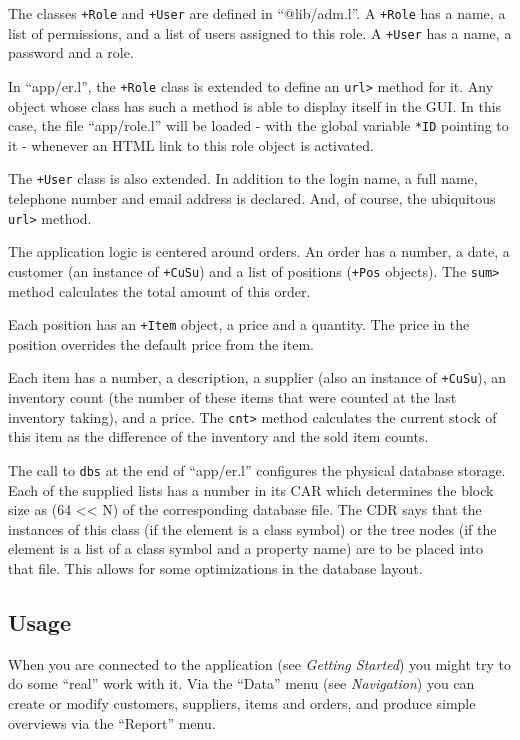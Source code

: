 The classes \texttt{+Role} and \texttt{+User} are defined in ``@lib/adm.l''. A \texttt{+Role}
has a name, a list of permissions, and a list of users assigned to this
role. A \texttt{+User} has a name, a password and a role.

In ``app/er.l'', the \texttt{+Role} class is extended to define an \texttt{url>} method
for it. Any object whose class has such a method is able to display
itself in the GUI. In this case, the file ``app/role.l'' will be loaded -
with the global variable \texttt{*ID} pointing to it - whenever an HTML link to
this role object is activated.

The \texttt{+User} class is also extended. In addition to the login name, a
full name, telephone number and email address is declared. And, of
course, the ubiquitous \texttt{url>} method.

The application logic is centered around orders. An order has a number,
a date, a customer (an instance of \texttt{+CuSu}) and a list of positions
(\texttt{+Pos} objects). The \texttt{sum>} method calculates the total amount of this
order.

Each position has an \texttt{+Item} object, a price and a quantity. The price
in the position overrides the default price from the item.

Each item has a number, a description, a supplier (also an instance of
\texttt{+CuSu}), an inventory count (the number of these items that were
counted at the last inventory taking), and a price. The \texttt{cnt>} method
calculates the current stock of this item as the difference of the
inventory and the sold item counts.

The call to \texttt{dbs} at the end of ``app/er.l'' configures the physical
database storage. Each of the supplied lists has a number in its CAR
which determines the block size as (64 << N) of the corresponding
database file. The CDR says that the instances of this class (if the
element is a class symbol) or the tree nodes (if the element is a list
of a class symbol and a property name) are to be placed into that file.
This allows for some optimizations in the database layout.

 
\subsection{Usage}
\label{sec:appl-devel-usage}

When you are connected to the application (see \emph{Getting Started})
you might try to do some ``real'' work with it. Via the ``Data'' menu
(see \emph{Navigation}) you can create or modify customers, suppliers,
items and orders, and produce simple overviews via the ``Report''
menu.
 


